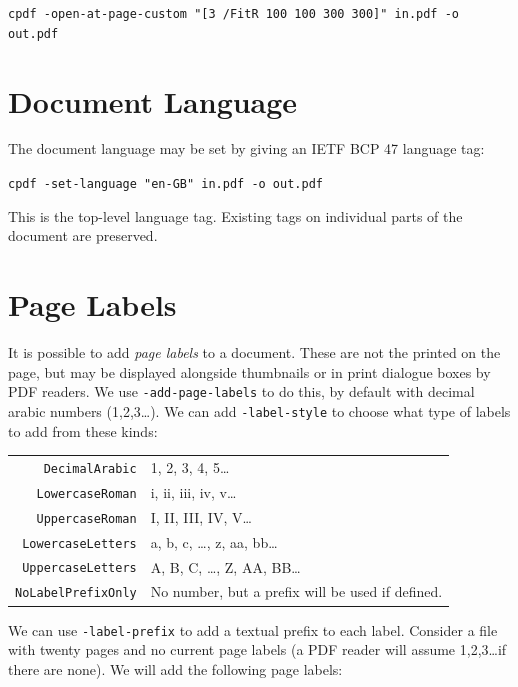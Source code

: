 \documentclass{book}
\begin{document}
  \begin{framed}
    \noindent\small\verb!cpdf -open-at-page-custom "[3 /FitR 100 100 300 300]" in.pdf -o out.pdf!
  \end{framed}

\section{Document Language}

The document language may be set by giving an IETF BCP 47 language tag:

  \begin{framed}
    \noindent\small\verb!cpdf -set-language "en-GB" in.pdf -o out.pdf!
  \end{framed}

\noindent This is the top-level language tag. Existing tags on individual parts of the document are preserved.

\section{Page Labels}

It is possible to add \textit{page labels} to a document. These are not the printed on the page, but may be displayed alongside thumbnails or in print dialogue boxes by PDF readers. We use \texttt{-add-page-labels} to do this, by default with decimal arabic numbers (1,2,3\ldots). We can add \texttt{-label-style} to choose what type of labels to add from these kinds:

\vspace{4mm}
{\small\begin{tabular}{rl}
  \texttt{DecimalArabic} & 1, 2, 3, 4, 5\ldots \\
  \texttt{LowercaseRoman} & i, ii, iii, iv, v\ldots \\
  \texttt{UppercaseRoman} & I, II, III, IV, V\ldots \\
  \texttt{LowercaseLetters} & a, b, c, \ldots , z, aa, bb\ldots \\
  \texttt{UppercaseLetters} & A, B, C, \ldots , Z, AA, BB\ldots \\
  \texttt{NoLabelPrefixOnly} & No number, but a prefix will be used if defined.
\end{tabular}}
\vspace{4mm}

\noindent We can use \texttt{-label-prefix} to add a textual prefix to each label. 
Consider a file with twenty pages and no current page labels (a PDF reader will assume 1,2,3\ldots if there are none). We will add the following page labels:
\end{document}
